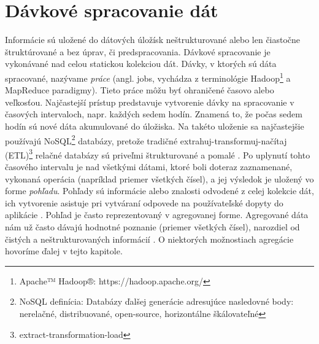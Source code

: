 

\section{Dávkové spracovanie dát}
Informácie sú uložené do dátových úložísk neštrukturované alebo len čiastočne štruktúrované a bez úprav, či predspracovania. Dávkové spracovanie je vykonávané nad celou statickou kolekciou dát. Dávky, v ktorých sú dáta spracované, nazývame \textit{práce} (angl. jobs, vychádza z terminológie Hadoop\footnote{Apache™ Hadoop®: https://hadoop.apache.org/} a MapReduce paradigmy). Tieto práce môžu byť ohraničené časovo alebo veľkosťou. Najčastejší prístup predstavuje vytvorenie dávky na spracovanie v časových intervaloch, napr. každých sedem hodín. Znamená to, že počas sedem hodín sú nové dáta akumulované do úložiska. Na takéto uloženie sa najčastejšie používajú NoSQL\footnote{NoSQL definícia: Databázy ďalšej generácie adresujúce nasledovné body: nerelačné, distribuované, open-source, horizontálne škálovateľné} databázy, pretože tradičné extrahuj-transformuj-načítaj (ETL)\footnote{extract-transformation-load} relačné databázy sú priveľmi štrukturované a pomalé \citep{liu2014survey}. Po uplynutí tohto časového intervalu je nad všetkými dátami, ktoré boli doteraz zaznamenané, vykonaná operácia (napríklad priemer všetkých čísel), a jej výsledok je uložený vo forme \textit{pohľadu}. Pohľady sú informácie alebo znalosti odvodené z celej kolekcie dát, ich vytvorenie asistuje pri vytváraní odpovede na používateľské dopyty do aplikácie \citep[s. 29]{marz2013big}. Pohľad je často reprezentovaný v agregovanej forme. Agregované dáta nám už často dávajú hodnotné poznanie (priemer všetkých čísel), narozdiel od čistých a neštrukturovaných informácií \citep{chaudhuri1997overview}. O niektorých možnostiach agregácie hovoríme ďalej v tejto kapitole.

\label{fig:davkove-spracovanie}

